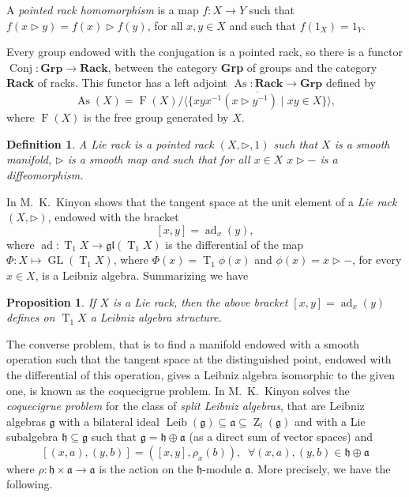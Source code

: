 \documentclass[english,4paper,10pt]{article}
\newcommand{\mg}{\mathfrak{g}}
\newtheorem{definition}[thm]{Definition}
\newtheorem{prop}[thm]{Proposition}
\begin{document}
A \textit{pointed rack homomorphism} is a map $f:X\rightarrow Y$ such that $f(x\rhd y)=f(x)\rhd f(y)$, for all $x,y\in X$ and such that $f(1_X)=1_Y$. 

Every group endowed with the conjugation is a pointed rack, so there is a functor $\operatorname{Conj}\colon \textbf{Grp}\rightarrow\textbf{Rack}$, between the category \textbf{Grp} of groups and the category \textbf{Rack} of racks. This functor has a left adjoint \hbox{$\operatorname{As}\colon \textbf{Rack}\rightarrow\textbf{Grp}$} defined by 
$$
\operatorname{As}(X)=\operatorname{F}(X)/\overline{\langle \lbrace xyx^{-1} \left(x\rhd y^{-1}\right) \;\vert\; xy\in X\rbrace \rangle},
$$ where $\operatorname{F}(X)$ is the free group generated by $X$. 
\begin{definition}
	A Lie rack is a pointed rack $\left(X,\rhd,1\right)$ such that $X$ is a smooth manifold, $\rhd$ is a smooth map and such that for all $x\in X$ $x\rhd -$ is a diffeomorphism.
\end{definition}


In \cite{kinyon2004leibniz} \mbox{M.\ K.\ Kinyon} shows that the tangent space at the unit element of a \textit{Lie rack} $(X,\rhd)$, endowed with the bracket 
$$
[x,y]=\operatorname{ad}_x(y),
$$
where $\operatorname{ad}\colon \operatorname{T}_1X\rightarrow\mathfrak{gl}(\operatorname{T}_1X)$ is the differential of the map $\Phi\colon X \mapsto \operatorname{GL}(\operatorname{T}_1X)$, where $\Phi(x)=\operatorname{T}_1\phi(x)$ and $\phi(x)=x \rhd -$, for every $x \in X$, is a Leibniz algebra. Summarizing we have

\begin{prop}{\cite{kinyon2004leibniz}}
	If $X$ is a Lie rack, then the above bracket $[x,y]=\operatorname{ad}_x(y)$ defines on $\operatorname{T}_1X$ a Leibniz algebra structure.
\end{prop}

The converse problem, that is to find a manifold
endowed with a smooth operation such that the tangent space at the distinguished point, endowed with the differential of this operation, gives a Leibniz algebra isomorphic to the given one, is known as the coquecigrue problem. In \cite{kinyon2004leibniz} M.\ K.\ Kinyon solves the \emph{coquecigrue problem} for the class of \emph{split Leibniz algebras}, that are Leibniz algebras $\mg$ with a bilateral ideal \mbox{$\operatorname{Leib}(\mg) \subseteq \mathfrak{a} \subseteq \operatorname{Z}_l(\mg)$} and with a Lie subalgebra $\mathfrak{h} \subseteq \mg$ such that $\mg=\mathfrak{h} \oplus \mathfrak{a}$ (as a direct sum of vector spaces) and 
$$
[(x,a),(y,b)]=([x,y],\rho_x(b)), \; \; \forall (x,a),(y,b) \in \mathfrak{h} \oplus \mathfrak{a}
$$
where $\rho\colon \mathfrak{h} \times \mathfrak{a} \rightarrow \mathfrak{a}$ is the action on the $\mathfrak{h}$-module $\mathfrak{a}$. More precisely, we have the following.
\end{document}
